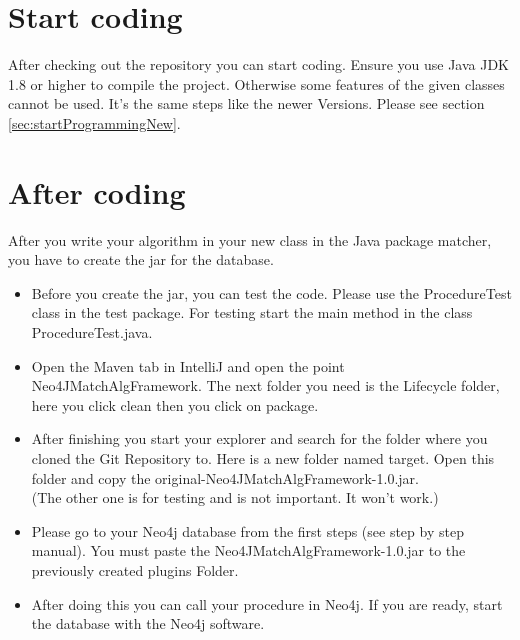 \section{Start coding}\label{sec:startProgramming}
After checking out the repository you can start coding. Ensure you use Java JDK 1.8 or higher to compile the project. Otherwise some features of the given classes cannot be used. It's the same steps like the newer Versions. Please see section \ref{sec:startProgrammingNew}.

\section{After coding}\label{sec:afterProgramming}
After you write your algorithm in your new class in the Java package matcher, you have to create the \glqq jar\grqq{} for the database.
\begin{itemize}
	\item Before you create the jar, you can test the code. Please use the \glqq ProcedureTest\grqq{} class in the test package. For testing start the main method in the class \glqq ProcedureTest.java\grqq{}.
	\item Open the Maven tab in \glqq IntelliJ \grqq{} and open the point \glqq Neo4JMatchAlgFramework\grqq{}. The next folder you need is the \glqq Lifecycle\grqq{} folder, here you click \glqq clean\grqq{} then you click on \glqq package\grqq{}.
	\item After finishing you start your explorer and search for the folder where you cloned the \glqq Git Repository\grqq{} to. Here is a new folder named target. Open this folder and copy the \glqq original-Neo4JMatchAlgFramework-1.0.jar\grqq{}. \\
	(The other one is for testing and is not important. It won't work.)
	\item Please go to your Neo4j database from the first steps (see step by step manual).%
	You must paste the \glqq Neo4JMatchAlgFramework-1.0.jar\grqq{} to the previously created \glqq plugins\grqq{} Folder.
	\item After doing this you can call your procedure in Neo4j. If you are ready, start the database with the Neo4j software.
\end{itemize}

